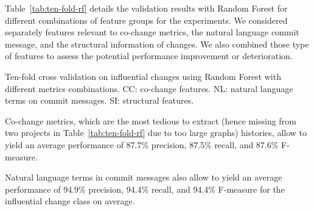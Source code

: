 Table~\ref{tab:ten-fold-rf} details the validation results with Random Forest for different combinations 
of feature groups for the experiments.
We considered separately features relevant to co-change metrics, the natural
language commit message, and the structural information of changes. We
also combined those type of features to assess the potential performance
improvement or deterioration.

\begin{table}[h!]
    \caption{Ten-fold cross validation on influential changes using 
    Random Forest with different metrics combinations. 
    CC: co-change features. NL: natural language terms on commit messages.
    SI: structural features.}
    \label{tab:ten-fold-rf}
    
\end{table}

Co-change metrics, which are the most tedious to extract (hence missing from two projects in Table~\ref{tab:ten-fold-rf} due to too large graphs)
histories, allow to yield an average performance of 87.7\% precision, 
87.5\% recall, and 87.6\% F-measure.


Natural language terms in commit messages also allow to yield an average
performance of 94.9\% precision, 94.4\% recall, and 94.4\% F-measure
for the influential change class on average.


